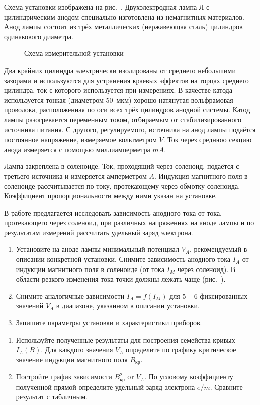 \experiment Схема установки изображена на рис.~. Двухэлектродная лампа $\text{Л}$ с цилиндрическим анодом специально изготовлена из немагнитных материалов. Анод лампы состоит из трёх металлических (нержавеющая сталь) цилиндров одинакового диаметра.
\begin{figure}[h!]
	\caption{Схема измерительной установки}
\end{figure}
Два крайних цилиндра электрически изолированы от среднего небольшими зазорами и используются для устранения краевых эффектов на торцах среднего цилиндра, ток с которого используется при измерениях. В качестве катода используется тонкая (диаметром 50~мкм) хорошо натянутая вольфрамовая проволока, расположенная по оси всех трёх цилиндров анодной системы. Катод лампы разогревается переменным током, отбираемым от стабилизированного источника питания. С другого,  регулируемого,  источника на анод лампы подаётся постоянное напряжение, измеряемое вольтметром $V$. Ток через среднюю секцию анода измеряется с помощью миллиамперметра $mA$.

Лампа закреплена в соленоиде. Ток, проходящий через соленоид, подаётся с третьего источника и измеряется амперметром $A$. Индукция магнитного поля в соленоиде рассчитывается по току, протекающему через обмотку соленоида. Коэффициент пропорциональности между ними указан на установке.

\begin{lab:task}

В работе предлагается исследовать зависимость анодного тока от тока, протекающего через соленоид, при различных
напряжениях на аноде лампы и по результатам измерений рассчитать удельный заряд электрона.

\begin{enumerate}
\item{ Установите на аноде лампы минимальный потенциал $V_A$, рекомендуемый в описании конкретной установки. Снимите зависимость анодного тока $I_A$ от индукции магнитного поля в соленоиде (от тока $I_{M}$ через соленоид). В области резкого изменения тока точки должны лежать чаще (рис.~)}.
\item{ Снимите аналогичные зависимости $I_A=f(I_M)$ для 5 -- 6 фиксированных значений $V_A$ в диапазоне, указанном в описании установки.}

\item{ Запишите параметры установки и характеристики приборов.}
\end{enumerate}

\begin{enumerate}
\item{Используйте полученные результаты для построения семейства кривых $I_{A}(B)$. Для каждого значения $V_A$ определите по графику критическое значение индукции магнитного поля $B_\text{кр}$}.
\item Постройте  график зависимости $B_\text{кр}^2$ от $V_A$. По угловому коэффициенту полученной прямой определите удельный заряд электрона $e/m$. Сравните результат с табличным.
\end{enumerate}
\end{lab:task}

